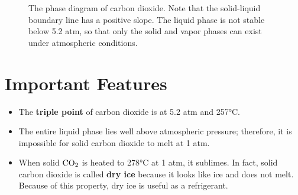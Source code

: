 \documentclass[a4paper,12pt,twocolumn]{article}
\begin{document}
\begin{figure}[h]
\end{figure}
\begin{figure}[h]
\caption{The phase diagram of carbon dioxide. Note that the solid-liquid boundary line
has a positive slope. The liquid phase is not stable below 5.2 atm, so that only the solid and vapor phases can exist under atmospheric conditions.
}
\end{figure}

\section{Important Features}
\begin{itemize}
\item The \textbf{triple point} of carbon dioxide is at 5.2 atm and 257°C.
\item The entire liquid phase lies well above atmospheric pressure; therefore, it is impossible for solid carbon dioxide to melt at 1 atm. 
\item When solid $\ce{CO2}$ is heated to 278°C at 1 atm, it sublimes. In fact, solid carbon dioxide is called \textbf{dry ice} because it looks like ice and does not melt. Because of this property, dry ice is useful as a refrigerant.
\end{itemize}
\end{document}
